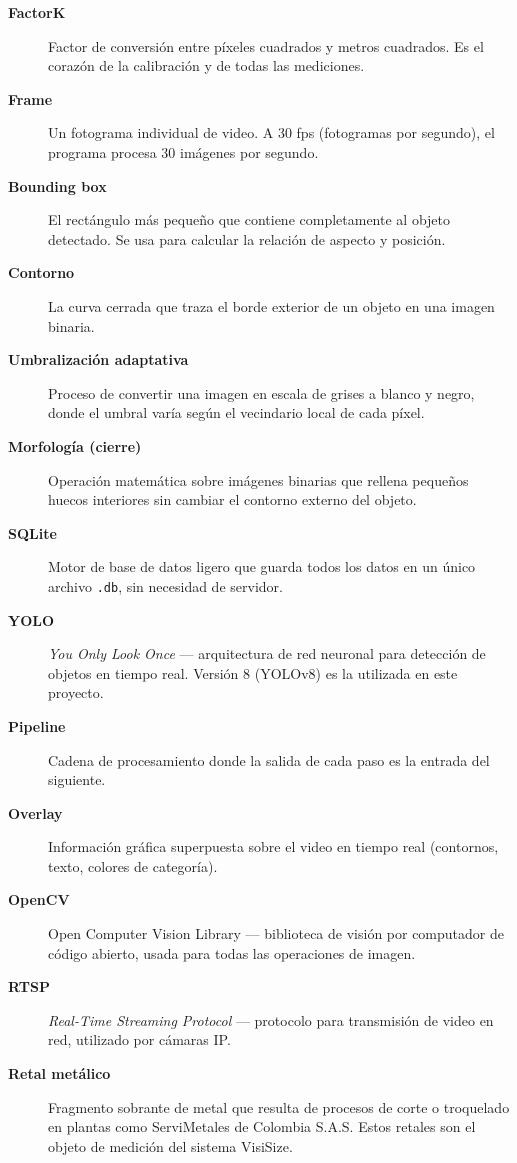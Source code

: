 \documentclass[12pt, a4paper]{article}
\begin{document}
\begin{description}
  \item[\textbf{FactorK}] Factor de conversión entre píxeles cuadrados y metros cuadrados.
        Es el corazón de la calibración y de todas las mediciones.
  \item[\textbf{Frame}] Un fotograma individual de video. A 30 fps (fotogramas por segundo),
        el programa procesa 30 imágenes por segundo.
  \item[\textbf{Bounding box}] El rectángulo más pequeño que contiene completamente al objeto
        detectado. Se usa para calcular la relación de aspecto y posición.
  \item[\textbf{Contorno}] La curva cerrada que traza el borde exterior de un objeto en una
        imagen binaria.
  \item[\textbf{Umbralización adaptativa}] Proceso de convertir una imagen en escala de grises
        a blanco y negro, donde el umbral varía según el vecindario local de cada píxel.
  \item[\textbf{Morfología (cierre)}] Operación matemática sobre imágenes binarias que rellena
        pequeños huecos interiores sin cambiar el contorno externo del objeto.
  \item[\textbf{SQLite}] Motor de base de datos ligero que guarda todos los datos en un único
        archivo \texttt{.db}, sin necesidad de servidor.
  \item[\textbf{YOLO}] \emph{You Only Look Once} — arquitectura de red neuronal para detección
        de objetos en tiempo real. Versión 8 (YOLOv8) es la utilizada en este proyecto.
  \item[\textbf{Pipeline}] Cadena de procesamiento donde la salida de cada paso
        es la entrada del siguiente.
  \item[\textbf{Overlay}] Información gráfica superpuesta sobre el video en tiempo real
        (contornos, texto, colores de categoría).
  \item[\textbf{OpenCV}] Open Computer Vision Library — biblioteca de visión por computador
        de código abierto, usada para todas las operaciones de imagen.
  \item[\textbf{RTSP}] \emph{Real-Time Streaming Protocol} — protocolo para transmisión de video
        en red, utilizado por cámaras IP.
  \item[\textbf{Retal metálico}] Fragmento sobrante de metal que resulta
  de procesos de corte o troquelado en plantas como ServiMetales de Colombia S.A.S.
  Estos retales son el objeto de medición del sistema VisiSize.


\end{description}
\end{document}
